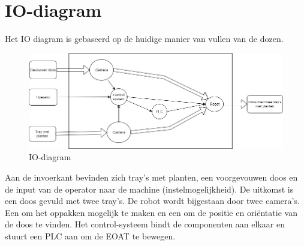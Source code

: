 
\section{IO-diagram}
Het IO diagram is gebaseerd op de huidige manier van vullen van de dozen.  
\newline
\newline
\begin{figure}[h]
	\centering
	\includegraphics[width=\textwidth]{Afbeeldingen/IO-diagram_v2.png}
	\caption{IO-diagram}
\end{figure}

Aan de invoerkant bevinden zich tray's met planten, een voorgevouwen doos en de input van de operator naar de machine (instelmogelijkheid). De uitkomst is een doos gevuld met twee tray's. \newline
De robot wordt bijgestaan door twee camera's. Een om het oppakken mogelijk te maken en een om de positie en oriëntatie van de doos te vinden. Het control-systeem bindt de componenten aan elkaar en stuurt een PLC aan om de EOAT te bewegen.


